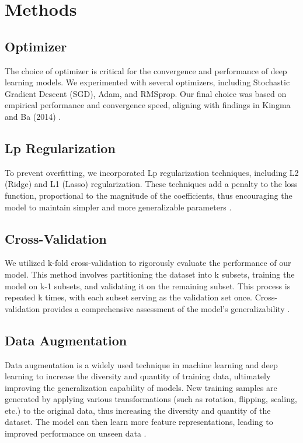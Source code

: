 \section{Methods}
\label{sec:methods}

\subsection{Optimizer}
The choice of optimizer is critical for the convergence and performance of deep learning models. We experimented with several optimizers, including Stochastic Gradient Descent (SGD), Adam, and RMSprop. Our final choice was based on empirical performance and convergence speed, aligning with findings in Kingma and Ba (2014) \cite{kingma2014adam}.

\subsection{Lp Regularization}
To prevent overfitting, we incorporated Lp regularization techniques, including L2 (Ridge) and L1 (Lasso) regularization. These techniques add a penalty to the loss function, proportional to the magnitude of the coefficients, thus encouraging the model to maintain simpler and more generalizable parameters \cite{ng2004feature}.

\subsection{Cross-Validation}
We utilized k-fold cross-validation to rigorously evaluate the performance of our model. This method involves partitioning the dataset into k subsets, training the model on k-1 subsets, and validating it on the remaining subset. This process is repeated k times, with each subset serving as the validation set once. Cross-validation provides a comprehensive assessment of the model’s generalizability \cite{kohavi1995study}.

\subsection{Data Augmentation}
Data augmentation is a widely used technique in machine learning and deep learning to increase the diversity and quantity of training data, ultimately improving the generalization capability of models. New training samples are generated by applying various transformations (such as rotation, flipping, scaling, etc.) to the original data, thus increasing the diversity and quantity of the dataset. The model can then learn more feature representations, leading to improved performance on unseen data \cite{shorten2019survey}.

